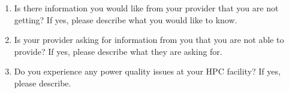 \begin{enumerate} [nosep]
\item
Is there information you would like from your provider that you are not getting? If yes, 
please describe what you would like to know.

\item
Is your provider asking for information from you that you are not able to provide? If yes, 
please describe what they are asking for.

\item
Do you experience any power quality issues at your HPC facility? If yes, please describe.

\end{enumerate}

